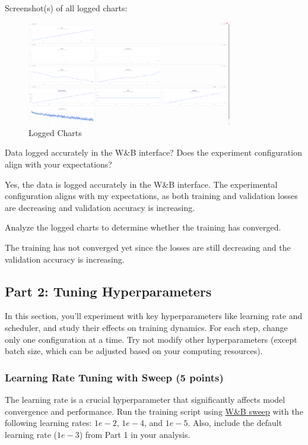 \documentclass[11pt, oneside]{article}   	%
\begin{document}
\begin{answerbox}
Screenshot(s) of all logged charts:

\begin{figure}[h]
    \centering
    \includegraphics[width=0.8\textwidth]{images/logged_charts.png}
    \caption{Logged Charts}
\end{figure}


Data logged accurately in the W\&B interface? Does the experiment configuration align with your expectations?

Yes, the data is logged accurately in the W\&B interface. The experimental configuration aligns with my expectations, as both training and validation losses are decreasing and validation accuracy is increasing.

Analyze the logged charts to determine whether the training has converged.

The training has not converged yet since the losses are still decreasing and the validation accuracy is increasing.

\end{answerbox}


\subsection*{Part 2: Tuning Hyperparameters}
In this section, you'll experiment with key hyperparameters like learning rate and scheduler, and study their effects on training dynamics. For each step, change only one configuration at a time. Try not modify other hyperparameters (except batch size, which can be adjusted based on your computing resources).

\subsubsection*{Learning Rate Tuning with Sweep (5 points)}
 The learning rate is a crucial hyperparameter that significantly affects model convergence and performance.  Run the training script using \href{https://docs.wandb.ai/guides/sweeps/walkthrough}{W\&B sweep} with the following learning rates: $1e-2$, $1e-4$, and $1e-5$. Also, include the default learning rate ($1e-3$) from Part 1 in your analysis.
\end{document}
